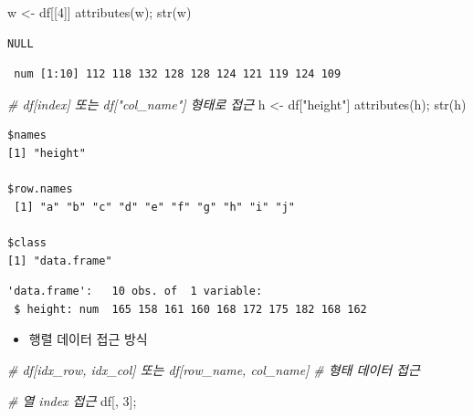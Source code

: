 \documentclass[
  11pt,
]{krantz}
\newenvironment{Shaded}{\begin{snugshade}}{\end{snugshade}}
\newcommand{\CommentTok}[1]{\textcolor[rgb]{0.37,0.37,0.37}{\textit{#1}}}
\newcommand{\DecValTok}[1]{\textcolor[rgb]{0.06,0.06,0.06}{#1}}
\newcommand{\FunctionTok}[1]{\textcolor[rgb]{0,0,0}{#1}}
\newcommand{\NormalTok}[1]{#1}
\newcommand{\OtherTok}[1]{\textcolor[rgb]{0.37,0.37,0.37}{#1}}
\newcommand{\StringTok}[1]{\textcolor[rgb]{0.5,0.5,0.5}{#1}}
\providecommand{\tightlist}{%
  \setlength{\itemsep}{0pt}\setlength{\parskip}{0pt}}
\begin{document}
\begin{Shaded}
\begin{Highlighting}[]
\NormalTok{w }\OtherTok{\textless{}{-}}\NormalTok{ df[[}\DecValTok{4}\NormalTok{]]}
\FunctionTok{attributes}\NormalTok{(w); }\FunctionTok{str}\NormalTok{(w)}
\end{Highlighting}
\end{Shaded}

\begin{verbatim}
NULL
\end{verbatim}

\begin{verbatim}
 num [1:10] 112 118 132 128 128 124 121 119 124 109
\end{verbatim}

\begin{Shaded}
\begin{Highlighting}[]
\CommentTok{\# df[index] 또는 df["col\_name"] 형태로 접근}
\NormalTok{h }\OtherTok{\textless{}{-}}\NormalTok{ df[}\StringTok{"height"}\NormalTok{]}
\FunctionTok{attributes}\NormalTok{(h); }\FunctionTok{str}\NormalTok{(h)}
\end{Highlighting}
\end{Shaded}

\begin{verbatim}
$names
[1] "height"

$row.names
 [1] "a" "b" "c" "d" "e" "f" "g" "h" "i" "j"

$class
[1] "data.frame"
\end{verbatim}

\begin{verbatim}
'data.frame':   10 obs. of  1 variable:
 $ height: num  165 158 161 160 168 172 175 182 168 162
\end{verbatim}

\normalsize

\begin{itemize}
\tightlist
\item
  행렬 데이터 접근 방식
\end{itemize}

\footnotesize

\begin{Shaded}
\begin{Highlighting}[]
\CommentTok{\# df[idx\_row, idx\_col] 또는 df[row\_name, col\_name] }
\CommentTok{\# 형태 데이터 접근}

\CommentTok{\# 열 index 접근}
\NormalTok{df[, }\DecValTok{3}\NormalTok{];}
\end{Highlighting}
\end{Shaded}
\end{document}
